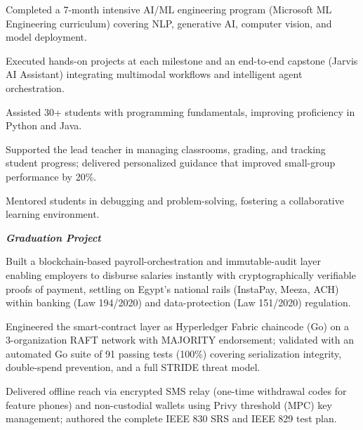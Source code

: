 \documentclass[a4paper,10pt]{article}
\begin{document}
\begin{cvitems}
  \item Completed a 7-month intensive AI/ML engineering program (Microsoft ML
        Engineering curriculum) covering NLP, generative AI, computer vision,
        and model deployment.
  \item Executed hands-on projects at each milestone and an end-to-end capstone
        (Jarvis AI Assistant) integrating multimodal workflows and intelligent
        agent orchestration.
\end{cvitems}

\begin{cvitems}
  \item Assisted 30+ students with programming fundamentals, improving
        proficiency in Python and Java.
  \item Supported the lead teacher in managing classrooms, grading, and tracking
        student progress; delivered personalized guidance that improved
        small-group performance by 20\%.
  \item Mentored students in debugging and problem-solving, fostering a
        collaborative learning environment.
\end{cvitems}


\textit{\textbf{Graduation Project}}
\begin{cvitems}
  \item Built a blockchain-based payroll-orchestration and immutable-audit layer
        enabling employers to disburse salaries instantly with cryptographically
        verifiable proofs of payment, settling on Egypt's national rails
        (InstaPay, Meeza, ACH) within banking (Law 194/2020) and data-protection
        (Law 151/2020) regulation.
  \item Engineered the smart-contract layer as Hyperledger Fabric chaincode (Go)
        on a 3-organization RAFT network with MAJORITY endorsement; validated
        with an automated Go suite of 91 passing tests (100\%) covering
        serialization integrity, double-spend prevention, and a full STRIDE
        threat model.
  \item Delivered offline reach via encrypted SMS relay (one-time withdrawal
        codes for feature phones) and non-custodial wallets using Privy
        threshold (MPC) key management; authored the complete IEEE 830 SRS and
        IEEE 829 test plan.
\end{cvitems}
\end{document}
